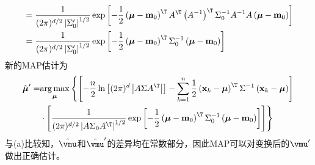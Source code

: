 \documentclass[reportComp]{thesis}
\begin{document}
\begin{answer}
\begin{itemize}
\[\begin{aligned}
	&=\frac{1}{(2 \pi)^{d / 2}\left|\Sigma_{0}^{\prime}\right|^{1 / 2}} \exp \left[-\frac{1}{2}\left(\boldsymbol{\mu}-\mathbf{m}_{0}\right)^{\T} A^{\T}\left(A^{-1}\right)^{\T} \Sigma_{0}^{-1} A^{-1} A\left(\boldsymbol{\mu}-\mathbf{m}_{0}\right)\right] \\
	&=\frac{1}{(2 \pi)^{d / 2}\left|\Sigma_{0}^{\prime}\right|^{1 / 2}} \exp \left[-\frac{1}{2}\left(\boldsymbol{\mu}-\mathbf{m}_{0}\right)^{\T} \Sigma_{0}^{-1}\left(\boldsymbol{\mu}-\mathbf{m}_{0}\right)\right]
	\end{aligned}\]
	新的MAP估计为
	\[\begin{aligned}
	\hat{\boldsymbol{\mu}}^{\prime}=& \underset{\boldsymbol{\mu}}{\arg \max }\left\{\left[-\frac{n}{2} \ln \left[(2 \pi)^{d}\left|A \Sigma A^{\T}\right|\right]
	-\sum_{k=1}^{n} \frac{1}{2}\left(\mathbf{x}_{k}-\boldsymbol{\mu}\right)^{\T} \Sigma^{-1}\left(\mathbf{x}_{k}-\boldsymbol{\mu}\right)\right]\right.\\
	&\left.\cdot\left[\frac{1}{(2 \pi)^{d / 2}\left|A \Sigma_0 A^{\T}\right|^{1 / 2}} \exp \left[-\frac{1}{2}\left(\boldsymbol{\mu}-\mathbf{m}_{0}\right)^{\T} \Sigma_{0}^{-1}\left(\boldsymbol{\mu}-\mathbf{m}_{0}\right)\right]\right]\right\}
	\end{aligned}\]
	与(a)比较知，$\hat{\vmu}$和$\hat{\vmu}'$的差异均在常数部分，因此MAP可以对变换后的$\vmu'$做出正确估计。
\end{itemize}
\end{answer}
\end{document}
